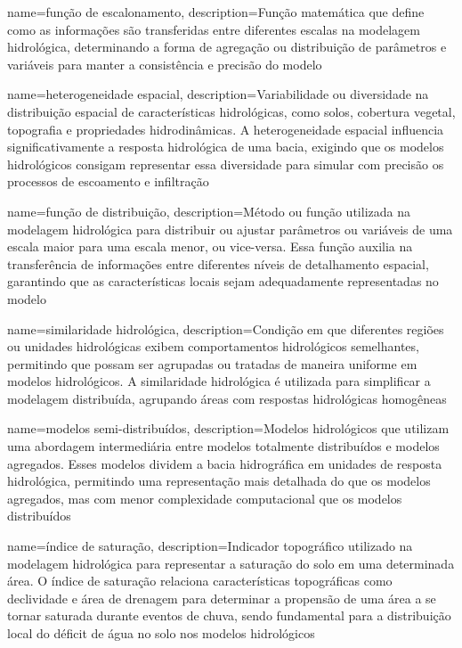 {
    name=função de escalonamento,
    description={Função matemática que define como as informações são transferidas entre diferentes escalas na modelagem hidrológica, determinando a forma de agregação ou distribuição de parâmetros e variáveis para manter a consistência e precisão do modelo}
}

{
    name=heterogeneidade espacial,
    description={Variabilidade ou diversidade na distribuição espacial de características hidrológicas, como solos, cobertura vegetal, topografia e propriedades hidrodinâmicas. A heterogeneidade espacial influencia significativamente a resposta hidrológica de uma bacia, exigindo que os modelos hidrológicos consigam representar essa diversidade para simular com precisão os processos de escoamento e infiltração}
}

{
    name=função de distribuição,
    description={Método ou função utilizada na modelagem hidrológica para distribuir ou ajustar parâmetros ou variáveis de uma escala maior para uma escala menor, ou vice-versa. Essa função auxilia na transferência de informações entre diferentes níveis de detalhamento espacial, garantindo que as características locais sejam adequadamente representadas no modelo}
}

{
    name=similaridade hidrológica,
    description={Condição em que diferentes regiões ou unidades hidrológicas exibem comportamentos hidrológicos semelhantes, permitindo que possam ser agrupadas ou tratadas de maneira uniforme em modelos hidrológicos. A similaridade hidrológica é utilizada para simplificar a modelagem distribuída, agrupando áreas com respostas hidrológicas homogêneas}
}

{
    name=modelos semi-distribuídos,
    description={Modelos hidrológicos que utilizam uma abordagem intermediária entre modelos totalmente distribuídos e modelos agregados. Esses modelos dividem a bacia hidrográfica em unidades de resposta hidrológica, permitindo uma representação mais detalhada do que os modelos agregados, mas com menor complexidade computacional que os modelos distribuídos}
}

{
    name=índice de saturação,
    description={Indicador topográfico utilizado na modelagem hidrológica para representar a saturação do solo em uma determinada área. O índice de saturação relaciona características topográficas como declividade e área de drenagem para determinar a propensão de uma área a se tornar saturada durante eventos de chuva, sendo fundamental para a distribuição local do déficit de água no solo nos modelos hidrológicos}
}

